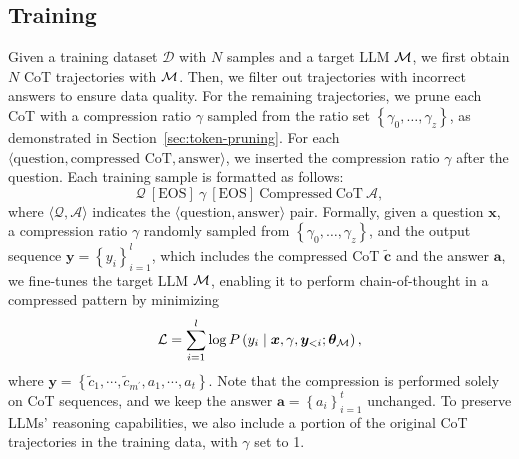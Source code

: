 \subsection{Training}
\label{sec:training}
Given a training dataset $\mathcal{D}$ with $N$ samples and a target LLM $\mathcal{M}$, we first obtain $N$ CoT trajectories with $\mathcal{M}$. Then, we filter out trajectories with incorrect answers to ensure data quality. For the remaining trajectories, we prune each CoT with a compression ratio $\gamma$ sampled from the ratio set $\left\{\gamma_0,\dots,\gamma_z\right\}$, as demonstrated in Section~\ref{sec:token-pruning}. For each $\langle\text{question}, \text{compressed CoT}, \text{answer}\rangle$, we inserted the compression ratio $\gamma$ after the question. Each training sample is formatted as follows: 
\begin{equation}
\nonumber
    \mathcal{Q} \ \mathrm{[EOS]} \ \gamma \ \mathrm{[EOS]} \ \mathrm{Compressed\ CoT} \ \mathcal{A},
\end{equation}
where $\langle\mathcal{Q}, \mathcal{A}\rangle$ indicates the $\langle\text{question}, \text{answer}\rangle$ pair. Formally, given a question $\boldsymbol{x}$, a compression ratio $\gamma$ randomly sampled from $\left\{\gamma_0,\dots,\gamma_z\right\}$, and the output sequence $\boldsymbol{y}=\left\{y_i\right\}_{i=1}^{l}$, which includes the compressed CoT $\widetilde{\boldsymbol{c}}$ and the answer $\boldsymbol{a}$, we fine-tunes the target LLM $\mathcal{M}$, enabling it to perform chain-of-thought in a compressed pattern by minimizing
\begin{equation}
\mathcal{L}=\sum_{i=1}^{l} \log P\left(y_{i} \mid \bm{x}, \gamma, \bm{y}_{<i}; \bm{\theta}_{\mathcal{M}}\right),
\end{equation}
where $\bm{y} =\left\{\widetilde{c}_1, \cdots,\widetilde{c}_{m^{\prime}}, a_1, \cdots, a_t  \right\}$. Note that the compression is performed solely on CoT sequences, and we keep the answer $\boldsymbol{a}=\left\{a_i\right\}_{i=1}^{t}$ unchanged. To preserve LLMs' reasoning capabilities, we also include a portion of the original CoT trajectories in the training data, with $\gamma$ set to 1.

